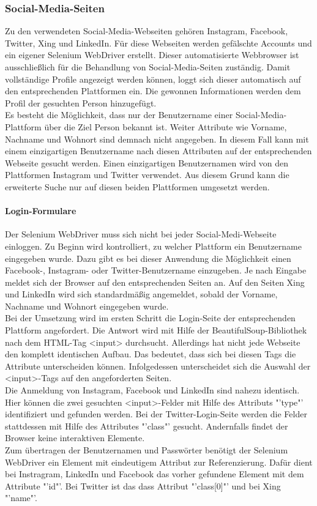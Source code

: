 			\subsubsection{Social-Media-Seiten}
			\label{subsubsec:SocialMediaSeiten}
			Zu den verwendeten Social-Media-Webseiten gehören Instagram, Facebook, Twitter, Xing und LinkedIn. Für diese Webseiten werden gefälschte Accounts und ein eigener Selenium WebDriver erstellt. Dieser automatisierte Webbrowser ist ausschließlich für die Behandlung von Social-Media-Seiten zuständig. Damit vollständige Profile angezeigt werden können, loggt sich dieser automatisch auf den entsprechenden Plattformen ein. Die gewonnen Informationen werden dem Profil der gesuchten Person hinzugefügt.\\
			Es besteht die Möglichkeit, dass nur der Benutzername einer Social-Media-Plattform über die Ziel Person bekannt ist. Weiter Attribute wie Vorname, Nachname und Wohnort sind demnach nicht angegeben. In diesem Fall kann mit einem einzigartigen Benutzername nach diesen Attributen auf der entsprechenden Webseite gesucht werden. Einen einzigartigen Benutzernamen wird von den Plattformen Instagram und Twitter verwendet. Aus diesem Grund kann die erweiterte Suche nur auf diesen beiden Plattformen umgesetzt werden.
			
			\paragraph{Login-Formulare}
			Der Selenium WebDriver muss sich nicht bei jeder Social-Medi-Webseite einloggen. Zu Beginn wird kontrolliert, zu welcher Plattform ein Benutzername eingegeben wurde. Dazu gibt es bei dieser Anwendung die Möglichkeit einen Facebook-, Instagram- oder Twitter-Benutzername einzugeben. Je nach Eingabe meldet sich der Browser auf den entsprechenden Seiten an. Auf den Seiten Xing und LinkedIn wird sich standardmäßig  angemeldet, sobald der Vorname, Nachname und Wohnort eingegeben wurde.\\
			Bei der Umsetzung wird im ersten Schritt die Login-Seite der entsprechenden Plattform angefordert. Die Antwort wird mit Hilfe der BeautifulSoup-Bibliothek nach dem HTML-Tag <input> durchsucht. Allerdings hat nicht jede Webseite den komplett identischen Aufbau. Das bedeutet, dass sich bei diesen Tags die Attribute unterscheiden können. Infolgedessen unterscheidet sich die Auswahl der <input>-Tags auf den angeforderten Seiten.\\
			Die Anmeldung von Instagram, Facebook und LinkedIn sind nahezu identisch. Hier können die zwei gesuchten <input>-Felder mit Hilfe des Attributs "'type"' identifiziert und gefunden werden. Bei der Twitter-Login-Seite werden die Felder stattdessen mit Hilfe des Attributes "'class"' gesucht. Andernfalls findet der Browser keine interaktiven Elemente.\\
			Zum übertragen der Benutzernamen und Passwörter benötigt der Selenium WebDriver ein Element mit eindeutigem Attribut zur Referenzierung. Dafür dient bei Instragram, LinkedIn und Facebook das vorher gefundene Element mit dem Attribute "'id"'. Bei Twitter ist das dass Attribut "'class[0]"' und bei Xing "'name"'.
			 
